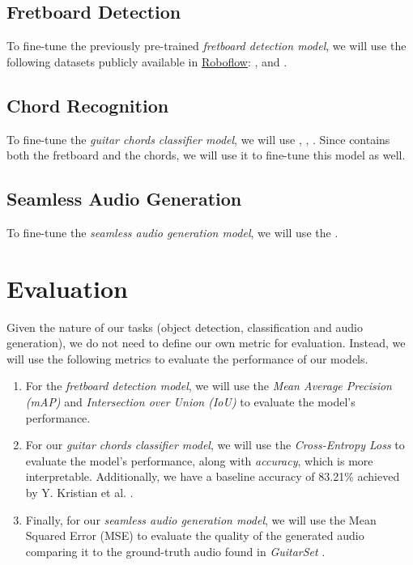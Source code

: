 \documentclass[10pt,twocolumn,letterpaper]{article}
\begin{document}
\subsection{Fretboard Detection}\label{subsec:fretboard-detection}
To fine-tune the previously pre-trained \emph{fretboard detection model}, we will use the following datasets publicly available in \href{https://universe.roboflow.com/}{Roboflow}: \cite{guitar-chords-daewp_dataset}, \cite{guitar-ppfil_dataset} and \cite{done-npcll_dataset}.

\subsection{Chord Recognition}
To fine-tune the \emph{guitar chords classifier model}, we will use \cite{guitar-chord-tvon8_dataset}, \cite{guitar-chord-bounding-box_dataset}, \cite{guitar-chord-handshape_dataset}. Since \cite{guitar-chords-daewp_dataset} contains both the fretboard and the chords, we will use it to fine-tune this model as well.

\subsection{Seamless Audio Generation}
To fine-tune the \emph{seamless audio generation model}, we will use the \cite{Xi2018}.

\section{Evaluation}

Given the nature of our tasks (object detection, classification and audio generation), we do not need to define our own metric for evaluation. Instead, we will use the following metrics to evaluate the performance of our models.

\begin{enumerate}[label=\arabic*), itemsep=0.25pt]
    \item For the \emph{fretboard detection model}, we will use the \emph{Mean Average Precision (mAP)} and \emph{Intersection over Union (IoU)} to evaluate the model's performance.
    \item For our \emph{guitar chords classifier model}, we will use the \emph{Cross-Entropy Loss} to evaluate the model's performance, along with \emph{accuracy}, which is more interpretable. Additionally, we have a baseline accuracy of 83.21\% achieved by Y. Kristian et al. \cite{Kristian_Zaman_Tenoyo_Jodhinata_2024}.
    \item Finally, for our \emph{seamless audio generation model}, we will use the Mean Squared Error (MSE) to evaluate the quality of the generated audio comparing it to the ground-truth audio found in \emph{GuitarSet} \cite{Xi2018}.
\end{enumerate}

{\small
    
    
}
\end{document}
